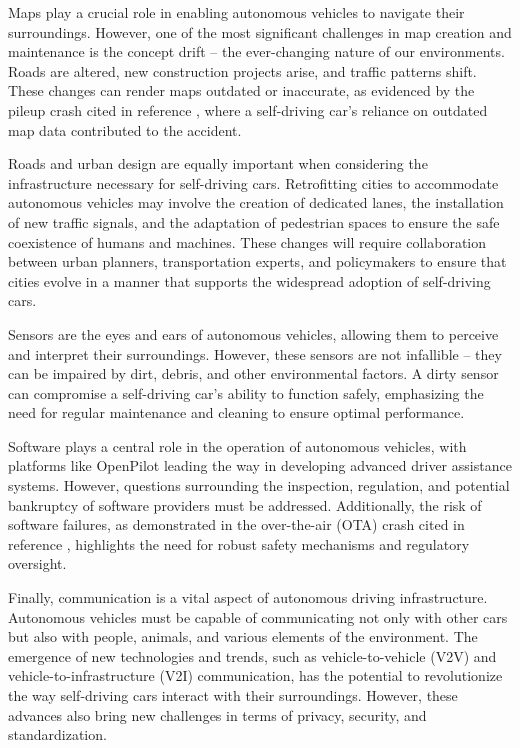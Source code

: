 Maps play a crucial role in enabling autonomous vehicles to navigate their surroundings. However, one of the most significant challenges in map creation and maintenance is the concept drift – the ever-changing nature of our environments. Roads are altered, new construction projects arise, and traffic patterns shift. These changes can render maps outdated or inaccurate, as evidenced by the pileup crash cited in reference \cite{pileupcrash}, where a self-driving car's reliance on outdated map data contributed to the accident.

Roads and urban design are equally important when considering the infrastructure necessary for self-driving cars. Retrofitting cities to accommodate autonomous vehicles may involve the creation of dedicated lanes, the installation of new traffic signals, and the adaptation of pedestrian spaces to ensure the safe coexistence of humans and machines. These changes will require collaboration between urban planners, transportation experts, and policymakers to ensure that cities evolve in a manner that supports the widespread adoption of self-driving cars.

Sensors are the eyes and ears of autonomous vehicles, allowing them to perceive and interpret their surroundings. However, these sensors are not infallible – they can be impaired by dirt, debris, and other environmental factors. A dirty sensor can compromise a self-driving car's ability to function safely, emphasizing the need for regular maintenance and cleaning to ensure optimal performance.

Software plays a central role in the operation of autonomous vehicles, with platforms like OpenPilot \cite{openpilot} leading the way in developing advanced driver assistance systems. However, questions surrounding the inspection, regulation, and potential bankruptcy of software providers must be addressed. Additionally, the risk of software failures, as demonstrated in the over-the-air (OTA) crash cited in reference \cite{otacrash}, highlights the need for robust safety mechanisms and regulatory oversight.

Finally, communication is a vital aspect of autonomous driving infrastructure. Autonomous vehicles must be capable of communicating not only with other cars but also with people, animals, and various elements of the environment. The emergence of new technologies and trends, such as vehicle-to-vehicle (V2V) and vehicle-to-infrastructure (V2I) communication, has the potential to revolutionize the way self-driving cars interact with their surroundings. However, these advances also bring new challenges in terms of privacy, security, and standardization.


